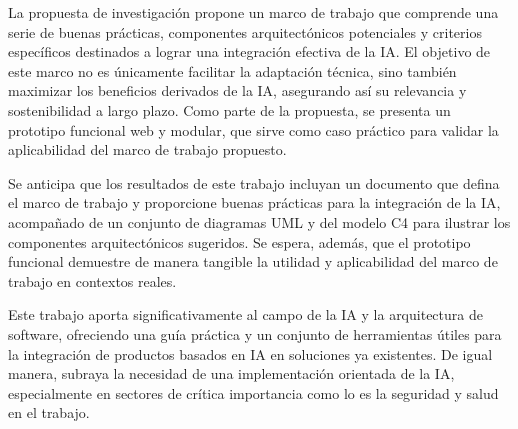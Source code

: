\begin{enumerate}
La propuesta de investigación propone un marco de trabajo que comprende una serie de buenas prácticas, componentes arquitectónicos potenciales y criterios específicos destinados a lograr una integración efectiva de la IA. El objetivo de este marco no es únicamente facilitar la adaptación técnica, sino también maximizar los beneficios derivados de la IA, asegurando así su relevancia y sostenibilidad a largo plazo. Como parte de la propuesta, se presenta un prototipo funcional web y modular, que sirve como caso práctico para validar la aplicabilidad del marco de trabajo propuesto.

Se anticipa que los resultados de este trabajo incluyan un documento que defina el marco de trabajo y proporcione buenas prácticas para la integración de la IA, acompañado de un conjunto de diagramas UML y del modelo C4 para ilustrar los componentes arquitectónicos sugeridos. Se espera, además, que el prototipo funcional demuestre de manera tangible la utilidad y aplicabilidad del marco de trabajo en contextos reales.

Este trabajo aporta significativamente al campo de la IA y la arquitectura de software, ofreciendo una guía práctica y un conjunto de herramientas útiles para la integración de productos basados en IA en soluciones ya existentes. De igual manera, subraya la necesidad de una implementación orientada de la IA, especialmente en sectores de crítica importancia como lo es la seguridad y salud en el trabajo.

\end{enumerate}
